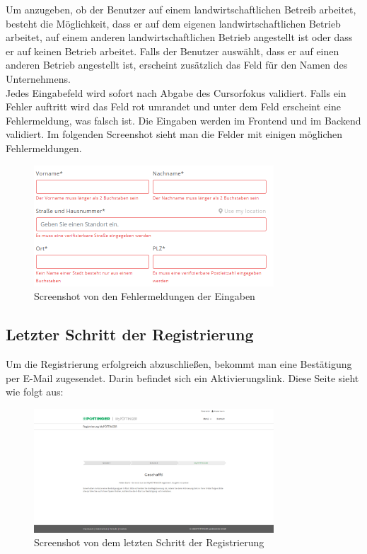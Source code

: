 Um anzugeben, ob der Benutzer auf einem landwirtschaftlichen Betreib arbeitet, besteht die Möglichkeit, dass er auf dem eigenen landwirtschaftlichen Betrieb arbeitet, auf einem anderen landwirtschaftlichen Betrieb angestellt ist oder dass er auf keinen Betrieb arbeitet. Falls der Benutzer auswählt, dass er auf einen anderen Betrieb angestellt ist, erscheint zusätzlich das Feld für den Namen des Unternehmens.\\

Jedes Eingabefeld wird sofort nach Abgabe des Cursorfokus validiert. Falls ein Fehler auftritt wird das Feld rot umrandet und unter dem Feld erscheint eine Fehlermeldung, was falsch ist. Die Eingaben werden im Frontend und im Backend validiert. Im folgenden Screenshot sieht man die Felder mit einigen möglichen Fehlermeldungen.

\begin{figure}[H]
	\centerline{
		\includegraphics[width=0.8\textwidth]{./grafiken/dateneingabe_Errors.PNG}
	}
	\vskip0pt
	\caption{Screenshot von den Fehlermeldungen der Eingaben} \label{fig:eingabeError}
\end{figure}

\subsection{Letzter Schritt der Registrierung}

Um die Registrierung erfolgreich abzuschließen, bekommt man eine Bestätigung per E-Mail zugesendet. Darin befindet sich ein Aktivierungslink. Diese Seite sieht wie folgt aus:

\begin{figure}[H]
	\centerline{
		\includegraphics[width=0.8\textwidth]{./grafiken/erm_register_final.png}
	}
	\vskip0pt
	\caption{Screenshot von dem letzten Schritt der Registrierung} \label{fig:step3register}
\end{figure}

